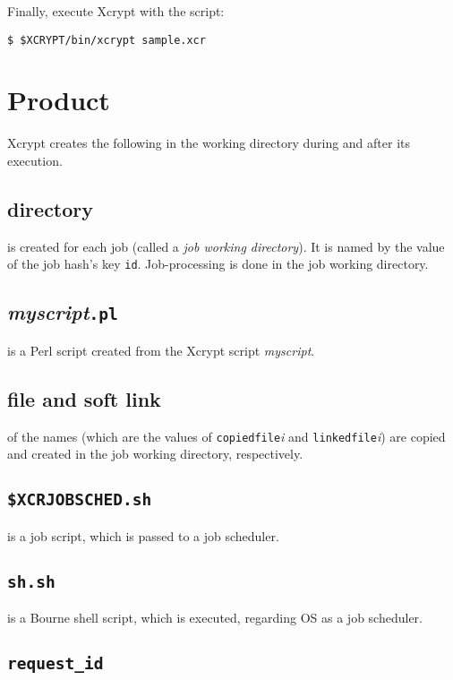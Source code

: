 \documentclass[a4paper,10pt]{report}
\begin{document}
Finally, execute Xcrypt with the script:
\begin{screen}
\texttt{\$ \$XCRYPT/bin/xcrypt sample.xcr}
\end{screen}

\section{Product}\label{sec:created}

Xcrypt creates the following in the working directory
during and after its execution.

\subsection*{directory}

is created for each job (called a \textit{job working directory}).  It is
named by the value of the job hash's key \texttt{id}.  Job-processing
is done in the job working directory.

\subsection*{\textit{myscript}\texttt{.pl}}

is a Perl script created from the Xcrypt script \textit{myscript}.

\subsection*{file and soft link}

of the names (which are the values of \texttt{copiedfile}\textit{i}
and \texttt{linkedfile}\textit{i}) are copied and created in the job
working directory, respectively.

\subsection*{\texttt{\$XCRJOBSCHED.sh}}

is a job script, which is passed to a job scheduler.

\subsection*{\texttt{sh.sh}}

is a Bourne shell script, which is executed, regarding OS as a job
scheduler.

\subsection*{\texttt{request\_id}}
\end{document}
